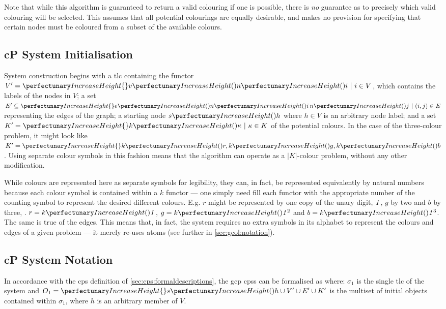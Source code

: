 Note that while this algorithm is guaranteed to return a valid colouring if one is possible, there is \emph{no} guarantee as to precisely which valid colouring will be selected.  This  assumes that all potential colourings are equally desirable, and makes no provision for specifying that certain nodes must be coloured from a subset of the available colours.

\subsection{\label{sec:gcol:sysinit}cP System Initialisation}
System construction begins with a \gls{tlc} containing the functor \(V' = \cpset{\cpfunc{v}{\cpfunc{n}{i}} ~|~i \in V}\), which contains the labels of the nodes in \(V\); a set \(E' \subseteq \cpset{\cpfunc{e}{\cpfunc{n}{i} \, \cpfunc{n}{j}} ~|~(i,j) \in E}\) representing the edges of the graph; a starting node \(\cpfunc{s}{h}\) where \(h \in V\) is an arbitrary node label; and a set \(K' = \cpset{\cpfunc{k}{\kappa} ~|~ \kappa \in K}\) of  the potential colours.  In the case of the three-colour problem, it might look like \(K' = \cpset{\cpfunc{k}{r}, \cpfunc{k}{g}, \cpfunc{k}{b}}\). Using separate colour symbols in this fashion means that the algorithm can operate as a \(|K|\)-colour problem, without any other modification.

While colours are represented here as separate symbols for legibility, they can, in fact, be represented equivalently by natural numbers because each colour symbol is contained within a \(k\) functor --- one simply need fill each functor with the appropriate number of the counting symbol to represent the desired different colours.  E.g. \(r\) might be represented by one copy of the unary digit, \(\mathit{1}\), \(g\) by two and \(b\) by three, \ie{}. \(r = \cpfunc{k}{\cpundig}\), \(g = \cpfunc{k}{\cpundig^2}\) and \(b = \cpfunc{k}{\cpundig^3}\).  The same is true of the edges.  This means that, in fact, the system requires no extra symbols in its alphabet to represent the colours and edges of a given problem --- it merely re-uses atoms (see further in \cref{sec:gcol:notation}).

\subsection{\label{sec:gcol:notation}cP System Notation}

In accordance with the \gls{cps} definition of \cref{sec:cps:formaldescriptions}, the \gls{gcp} \glspl{cps} can be formalised as  where: \(\sigma_1\) is the single \gls{tlc} of the system and \(O_1 = \cpset{\cpfunc{s}{h}} \cup V' \allowbreak \cup E' \allowbreak \cup K'\) is the multiset of initial objects contained within \(\sigma_1\), where \(h\) is an arbitrary member of \(V\).


